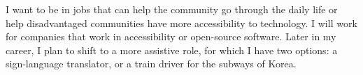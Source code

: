 

\begin{cvparagraph}
    I want to be in jobs that can help the community go through the daily life or help disadvantaged communities have more accessibility to technology. I will work for companies that work in accessibility or open-source software. Later in my career, I plan to shift to a more assistive role, for which I have two options: a sign-language translator, or a train driver for the subways of Korea. 

\end{cvparagraph}